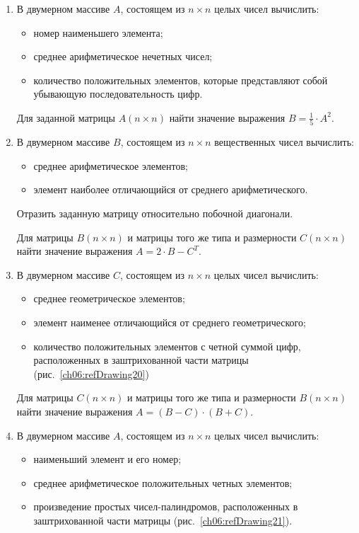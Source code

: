 \begin{enumerate}
\item В двумерном массиве $A$, состоящем из $n\times n$ целых чисел вычислить: 

\begin{itemize}
\item номер наименьшего элемента;
\item среднее арифметическое нечетных чисел;
\item количество положительных элементов, которые представляют собой  убывающую последовательность цифр.
\end{itemize}

Для заданной матрицы $A(n\times n)$ найти значение выражения  $B=\frac{1}{5}\cdot A^2$.
\item В двумерном массиве $B$, состоящем из $n\times n$ вещественных чисел вычислить:
\begin{itemize}
\item среднее арифметическое элементов;
\item элемент наиболее отличающийся от среднего арифметического.
\end{itemize}

Отразить заданную матрицу относительно побочной диагонали.

Для матрицы $B(n\times n)$ и матрицы того же типа и размерности $C(n\times n)$
найти значение выражения  $A=2\cdot B-C^T$.
\item В двумерном массиве $C$, состоящем из $n\times n$ целых чисел вычислить:

\begin{itemize}
\item среднее геометрическое элементов;
\item элемент наименее отличающийся от среднего геометрического;
\item количество положительных элементов с четной суммой цифр, расположенных в заштрихованной 
части матрицы (рис.~\ref{ch06:refDrawing20})
\end{itemize}
Для матрицы $C(n\times n)$ и матрицы того же типа и размерности $B(n\times n)$
найти значение выражения  $A=(B-C)\cdot (B+C)$.


\item В двумерном массиве $A$, состоящем из $n\times n$ целых чисел вычислить:

\begin{itemize}
\item наименьший элемент и его номер;
\item среднее арифметическое положительных четных элементов;
\item произведение простых чисел-палиндромов, расположенных в заштрихованной 
части матрицы (рис.~\ref{ch06:refDrawing21}).
\end{itemize}


\end{enumerate}
